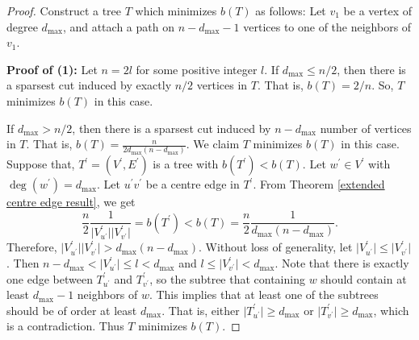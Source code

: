\documentclass[12pt]{article}
\begin{document}
\begin{proof}
Construct a tree $T$ which minimizes $b(T)$ as follows:  Let $v_1$ be a vertex of degree $d_{\max}$, and attach a path on $n-d_{\max}-1$ vertices to one of the neighbors of $v_1$.


\noindent\textbf{Proof of (1): } Let $n=2l$ for some positive integer $l$.
If $d_{\max} \leq n/2$, then there is a sparsest cut induced by exactly ${n/2}$ vertices in $T$. That is, $b(T)=2/n$. So, $T$ minimizes $b(T)$ in this case.


If $d_{\max} > n/2$, then there is a sparsest cut induced by $n-d_{\max}$ number of vertices in $T$. That is, $b(T)=\frac{n}{2d_{\max}(n-d_{\max})}$.  We claim $T$ minimizes $b(T)$ in this case. Suppose that,  $T^\prime=(V^\prime,E^\prime)$ is a tree with $b(T^\prime) <b(T)$. Let $w^\prime \in V^\prime$ with $\deg(w^\prime)=d_{\max}$. Let $u^\prime v^\prime$ be a centre edge in $T^\prime$. From Theorem \ref{extended centre edge result}, we get
 $$
\frac{n}{2}\frac{1}{\vert V^\prime_{u^\prime}\vert \vert V^\prime_{v^\prime}\vert}=b(T^\prime)<b(T)=\frac{n}{2}\frac{1}{d_{\max}(n-d_{\max})}.
 $$
  Therefore, $\vert V^\prime_{u^\prime}\vert \vert V^\prime_{v^\prime}\vert > d_{\max}(n-d_{\max})$. Without loss of generality, let $\vert V^\prime_{u^\prime}\vert \leq \vert V^\prime_{v^\prime}\vert$. Then $n-d_{\max} < \vert V^\prime_{u^\prime}\vert \leq l <d_{\max}$ and $l \leq \vert V^\prime_{v^\prime}\vert <d_{\max}$. Note that there is exactly one edge between $T^\prime_{u^\prime}$ and $T^\prime_{v^\prime}$, so the subtree that containing $w$ should contain at least $d_{\max}-1$ neighbors of $w$. This implies that at least one of the subtrees should be of order at least $d_{\max}$. That is, either $\vert T^\prime_{u^{'}} \vert \geq d_{\max}$ or  $\vert T^\prime_{v^{'}} \vert \geq d_{\max}$, which is  a contradiction. Thus $T$ minimizes $b(T)$.


\end{proof}
\end{document}
